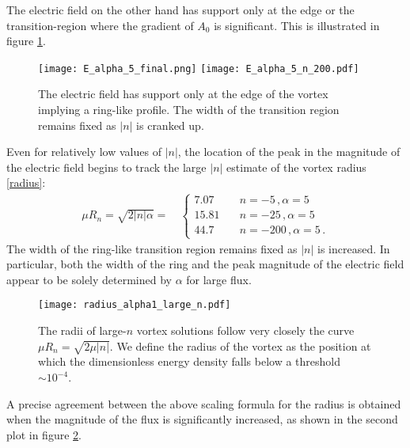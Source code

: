 \documentclass[12pt,a4paper]{article}
\newcommand{\bea}{\begin{eqnarray}}
\newcommand{\eea}{\end{eqnarray}}
\begin{document}
 The electric field on the other hand has support only at the edge or the transition-region where the gradient of $A_0$ is significant. This is illustrated in figure \ref{fig:Eneg}.
\begin{figure}[h]
\begin{center}
    \texttt{[image: E\_alpha\_5\_final.png]} \texttt{[image: E\_alpha\_5\_n\_200.pdf]} 
   \caption{ {\small The electric field has support only at the edge of the vortex implying a ring-like profile. 
   The width of the transition region remains fixed as $|n|$ is cranked up.} }\label{fig:Eneg}
   \end{center}
\end{figure}
Even for relatively low values of $|n|$, the location of the peak in the magnitude of the electric field begins to track the large $|n|$ estimate of the vortex radius \eqref{radius}:
\bea
\mu R_n = \sqrt{2|n|\alpha} = \quad
\left\{\begin{matrix}
7.07 & \quad n=-5\,,\alpha=5\\
15.81&\quad n=-25\,,\alpha=5\\
44.7 & \quad n=-200\,,\alpha=5\,.
\end{matrix}\right.
\eea
The width of the ring-like transition region remains fixed as $|n|$ is increased. In particular, both the width of the ring and the peak magnitude of the electric field appear to be solely determined by $\alpha$ for large flux.
\begin{figure}[h]
\begin{center}
    \texttt{[image: radius\_alpha1\_large\_n.pdf]}  
   \caption{ {\small The radii of large-$n$ vortex solutions follow very closely the curve $\mu R_n=\sqrt{2\mu |n|}$.
We define the radius of the vortex as the position at which the dimensionless energy density falls below a threshold $\sim 10^{-4}$. } }\label{fig:radius}
   \end{center}
\end{figure}
A precise agreement between the above scaling formula for the radius is obtained when the magnitude of the flux is significantly increased, as shown in the second plot in figure \ref{fig:radius}.
\end{document}
